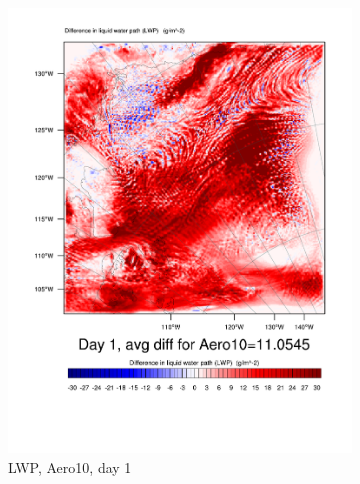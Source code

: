 \begin{figure}[h]
\centering
	\begin{subfigure}{0.30\textwidth}
		\centering
		\includegraphics[width=\textwidth]{results/aero10/Diff_LWP_Day1Aero10.pdf}
		\caption{LWP, Aero10, day 1}
		\label{subfig:LWPr3Day1}
	\end{subfigure}
	\quad
	\begin{subfigure}{0.30\textwidth}
		\centering

\end{subfigure}
\end{figure}
